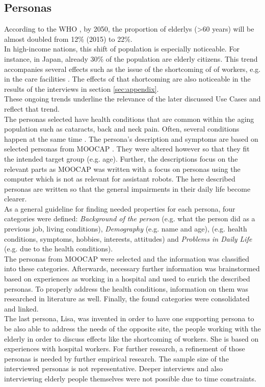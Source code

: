 \documentclass[plainarticle,zihtitle,english,final,hyperref,utf8]{zihpub}
\begin{document}
\subsection{Personas}
\label{sec:personas}
According to the WHO \cite{who18}, by 2050, the proportion of elderlys (>60 years) will be almost doubled from 12\% (2015) to 22\%.\\
In high-income nations, this shift of population is especially noticeable. For instance, in Japan, already 30\% of the population are elderly citizens. This trend accompanies several effects such as the issue of the shortcoming of of workers, e.g. in the care facilities \cite{yamazaki12}. The effects of that shortcoming are also noticeable in the results of the interviews in section \ref{sec:appendix}.\\
These ongoing trends underline the relevance of the later discussed Use Cases and reflect that trend.\\
\newline
The personas selected have health conditions that are common within the aging population such as cataracts, back and neck pain. Often, several conditions happen at the same time \cite{who18}. The persona's description and symptoms are based on selected personas from MOOCAP \cite{moo}. They were altered however so that they fit the intended target group (e.g. age). Further, the descriptions focus on the relevant parts as MOOCAP was written with a focus on personas using the computer which is not as relevant for assistant robots. The here described personas are written so that the general impairments in their daily life become clearer.\\
\newline
As a general guideline for finding needed properties for each persona, four categories were defined: \textit{Background of the person} (e.g. what the person did as a previous job, living conditions), \textit{Demography} (e.g. name and age),  (e.g. health conditions, symptoms, hobbies, interests, attitudes) and \textit{Problems in Daily Life} (e.g. due to the health conditions).\\
The personas from MOOCAP were selected and the information was classified into these categories. Afterwards, necessary further information was brainstormed based on experiences as working in a hospital and used to enrich the described personas. To properly address the health conditions, information on them was researched in literature as well. Finally, the found categories were consolidated and linked. \\
The last persona, Lisa, was invented in order to have one supporting persona to be also able to address the needs of the opposite site, the people working with the elderly in order to discuss effects like the shortcoming of workers. She is based on experiences with hospital workers.
\newline
For further research, a refinement of those personas is needed by further empirical research. The sample size of the interviewed personas is not representative. Deeper interviews and also interviewing elderly people themselves were not possible due to time constraints.
\end{document}
